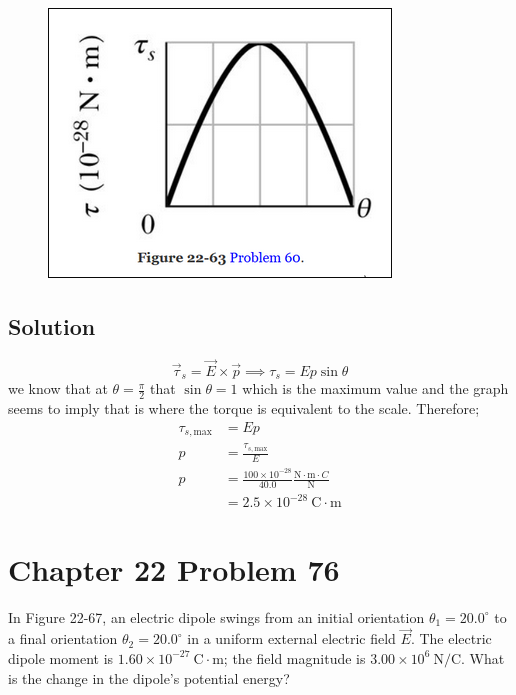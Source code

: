 \documentclass{article}
\newcommand{\m}{\text{m}}
\newcommand{\N}{\text{N}}
\newcommand{\C}{\text{C}}
\begin{document}
\begin{figure}[ht]
    \centering
    \includegraphics[scale=0.55]{image-1.png}
\end{figure}


\subsection*{Solution}
\[
	\vec \tau_s = \vec E \times \vec p \implies \tau_s = Ep\sin \theta
\]
we know that at $\theta = \frac{\pi}{2}$ that $\sin \theta = 1$ which is the maximum value and the graph seems to imply that is where the torque is equivalent to the scale. Therefore;
\begin{align*}
	\tau_{s,\text{max}} &= Ep \\
	p &= \frac{\tau_{s,\text{max}}}{E}   \\
	p &= \frac{100 \times 10^{-28}}{40.0} \frac{\N \cdot \m \cdot C}{\N}\\
	  &= \boxed{2.5\times10^{-28}\ \C \cdot \m}
\end{align*}

\section*{Chapter 22 Problem 76}
In Figure 22-67, an electric dipole swings from an initial orientation $\theta_1 = 20.0^\circ$ to a final orientation $\theta_2 = 20.0^\circ$ in a uniform external electric field $\vec E$. The electric dipole moment is $1.60 \times 10^{-27}\ \C \cdot \m$; the field magnitude is $3.00 \times 10^6\ \N/\C$. What is the change in the dipole's potential energy?
\end{document}
